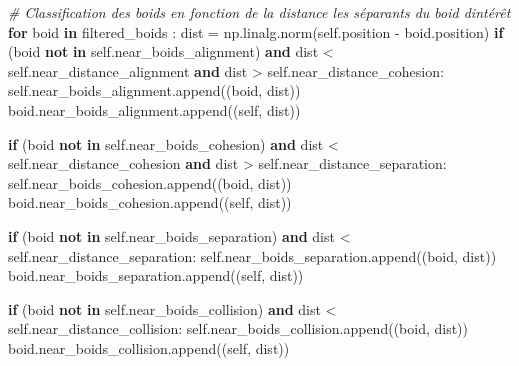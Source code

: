 \documentclass[
]{article}
\newenvironment{Shaded}{}{}
\newcommand{\CommentTok}[1]{\textcolor[rgb]{0.38,0.63,0.69}{\textit{#1}}}
\newcommand{\ControlFlowTok}[1]{\textcolor[rgb]{0.00,0.44,0.13}{\textbf{#1}}}
\newcommand{\KeywordTok}[1]{\textcolor[rgb]{0.00,0.44,0.13}{\textbf{#1}}}
\newcommand{\NormalTok}[1]{#1}
\newcommand{\OperatorTok}[1]{\textcolor[rgb]{0.40,0.40,0.40}{#1}}
\newcommand{\VariableTok}[1]{\textcolor[rgb]{0.10,0.09,0.49}{#1}}
\begin{document}
\begin{Shaded}
\begin{Highlighting}[]
\CommentTok{\# Classification des boids en fonction de la distance les séparants du boid d\textquotesingle{}intérêt}
    \ControlFlowTok{for}\NormalTok{ boid }\KeywordTok{in}\NormalTok{ filtered\_boids :}
\NormalTok{        dist }\OperatorTok{=}\NormalTok{ np.linalg.norm(}\VariableTok{self}\NormalTok{.position }\OperatorTok{{-}}\NormalTok{ boid.position)}
        \ControlFlowTok{if}\NormalTok{ (boid }\KeywordTok{not} \KeywordTok{in} \VariableTok{self}\NormalTok{.near\_boids\_alignment) }\KeywordTok{and}\NormalTok{ dist }\OperatorTok{\textless{}} \VariableTok{self}\NormalTok{.near\_distance\_alignment }\KeywordTok{and}\NormalTok{ dist }\OperatorTok{\textgreater{}} \VariableTok{self}\NormalTok{.near\_distance\_cohesion:}
            \VariableTok{self}\NormalTok{.near\_boids\_alignment.append((boid, dist))}
\NormalTok{            boid.near\_boids\_alignment.append((}\VariableTok{self}\NormalTok{, dist))}

        \ControlFlowTok{if}\NormalTok{ (boid }\KeywordTok{not} \KeywordTok{in} \VariableTok{self}\NormalTok{.near\_boids\_cohesion) }\KeywordTok{and}\NormalTok{ dist }\OperatorTok{\textless{}} \VariableTok{self}\NormalTok{.near\_distance\_cohesion }\KeywordTok{and}\NormalTok{ dist }\OperatorTok{\textgreater{}} \VariableTok{self}\NormalTok{.near\_distance\_separation:}
            \VariableTok{self}\NormalTok{.near\_boids\_cohesion.append((boid, dist))}
\NormalTok{            boid.near\_boids\_cohesion.append((}\VariableTok{self}\NormalTok{, dist))}

        \ControlFlowTok{if}\NormalTok{ (boid }\KeywordTok{not} \KeywordTok{in} \VariableTok{self}\NormalTok{.near\_boids\_separation) }\KeywordTok{and}\NormalTok{ dist }\OperatorTok{\textless{}} \VariableTok{self}\NormalTok{.near\_distance\_separation:}
            \VariableTok{self}\NormalTok{.near\_boids\_separation.append((boid, dist))}
\NormalTok{            boid.near\_boids\_separation.append((}\VariableTok{self}\NormalTok{, dist))}

        \ControlFlowTok{if}\NormalTok{ (boid }\KeywordTok{not} \KeywordTok{in} \VariableTok{self}\NormalTok{.near\_boids\_collision) }\KeywordTok{and}\NormalTok{ dist }\OperatorTok{\textless{}} \VariableTok{self}\NormalTok{.near\_distance\_collision:}
            \VariableTok{self}\NormalTok{.near\_boids\_collision.append((boid, dist))}
\NormalTok{            boid.near\_boids\_collision.append((}\VariableTok{self}\NormalTok{, dist))}
\end{Highlighting}
\end{Shaded}
\end{document}
